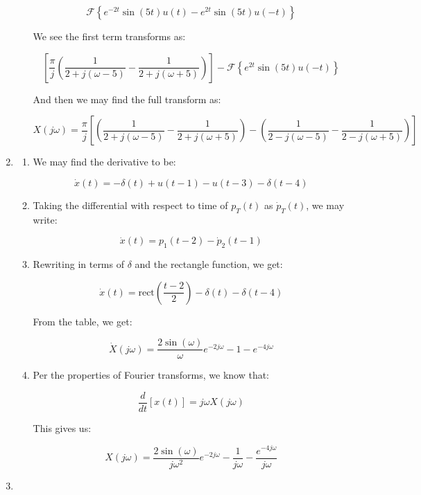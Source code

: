 \begin{enumerate}
\begin{enumerate}
        $$\mathcal{F}\left\{ e^{-2t}\sin(5t)u(t)-e^{2t}\sin(5t)u(-t) \right\}$$

        We see the first term transforms as:

        $$\left[ \frac{\pi}{j}\left( \frac{1}{2+j(\omega-5)}-\frac{1}{2+j(\omega+5)} \right) \right]-\mathcal{F}\left\{ e^{2t}\sin(5t)u(-t) \right\}$$

        And then we may find the full transform as:

        $$\boxed{X(j\omega)=\frac{\pi}{j}\left[ \left( \frac{1}{2+j(\omega-5)}-\frac{1}{2+j(\omega+5)} \right) -\left( \frac{1}{2-j(\omega-5)}-\frac{1}{2-j(\omega+5)} \right)\right]}$$

    \end{enumerate}

  \item

    \begin{enumerate}

      \item We may find the derivative to be:

        $$\boxed{\dot{x}(t)=-\delta(t)+u(t-1)-u(t-3)-\delta(t-4)}$$

      \item Taking the differential with respect to time of $p_T(t)$ as $\dot{p}_T(t)$, we may write:

        $$\boxed{\dot{x}(t)=p_1(t-2)-\dot{p}_2(t-1)}$$

      \item Rewriting in terms of $\delta$ and the rectangle function, we get:

        $$\dot{x}(t)=\text{rect}\left( \frac{t-2}{2} \right)-\delta(t)-\delta(t-4)$$

        From the table, we get:

        $$\boxed{\dot{X}(j\omega)=\frac{2\sin(\omega)}{\omega}e^{-2j\omega}-1-e^{-4j\omega}}$$

      \item Per the properties of Fourier transforms, we know that:

        $$\frac{d}{dt}[x(t)]=j\omega X(j\omega)$$

        This gives us:

        $$\boxed{X(j\omega)=\frac{2\sin(\omega)}{j\omega^2}e^{-2j\omega}-\frac{1}{j\omega}-\frac{e^{-4j\omega}}{j\omega}}$$

    \end{enumerate}

  \item


\end{enumerate}
